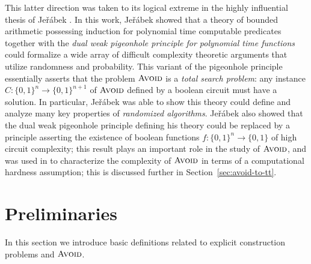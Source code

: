 \documentclass[11pt]{article}
\newcommand{\todo}[1]{\textcolor{red}{TODO: #1}}
\newcommand{\B}{\{0,1\}}
\newcommand{\avoid}{\textsc{Avoid}}
\newcommand{\jer}{Je\v{r}\'{a}bek}
\begin{document}
This latter direction was taken to its logical extreme in the highly influential thesis of Je{\v{r}}{\'{a}}bek \cite{Jerabek}. In this work, Je{\v{r}}{\'{a}}bek showed that a theory of bounded arithmetic possessing induction for polynomial time computable predicates together with the \emph{dual weak pigeonhole principle for polynomial time functions} could formalize a wide array of difficult complexity theoretic arguments that utilize randomness and probability. This variant of the pigeonhole principle essentially asserts that the problem $\avoid$ is a \emph{total search problem}: any instance $C: \B^n \to \B^{n+1}$ of $\avoid$ defined by a boolean circuit must have a solution. In particular, Je{\v{r}}{\'{a}}bek was able to show this theory could define and analyze many key properties of \emph{randomized algorithms}. Je{\v{r}}{\'{a}}bek also showed that the dual weak pigeonhole principle defining his theory could be replaced by a principle asserting the existence of boolean functions $f: \B^n \to \B$ of high circuit complexity; this result plays an important role in the study of $\avoid$, and was used in \cite{Korten1} to characterize the complexity of $\avoid$ in terms of a computational hardness assumption; this is discussed further in Section~\ref{sec:avoid-to-tt}.



\section{Preliminaries}\label{sec:prelim}
In this section we introduce basic definitions related to explicit construction problems and $\avoid$.
\end{document}
